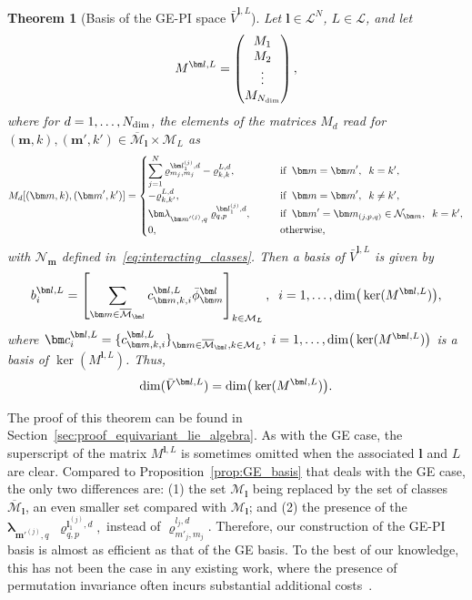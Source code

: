 \documentclass{article}
\newcommand{\vrho}[2]{\varrho^{#1}_{#2}}
\newcommand{\blamb}[2]{\bm\lambda^{#1}_{#2}}
\newcommand{\bphi}[2]{\bar\phi^{#1}_{#2}}
\newcommand{\bV}{{\bar V}}
\newcommand{\dd}{{d}}
\newcommand{\dimpi}[2]{\dim(\bV^{#1,#2})}
\newtheorem{theorem}{Theorem}[section]
\numberwithin{equation}{section}
\def\bc{{\bm c}}
\def\bl{{\bm l}}
\def\bbm{{\bm m}}
\def\calN{\mathcal{N}}
\def\calM{\mathcal{M}}
\def\calL{\mathcal{L}}
\def\oMl{\overline{\calM}_\bl}
\def\Nat{{N}}
\def\dim{{{\rm dim}}}
\begin{document}
{\begin{theorem}[Basis of the GE-PI space $\bV^{\bl,L}$]
\label{thm:GEPI_basis}
Let $\bl\in\calL^\Nat$, $L\in\calL$, and let 
\begin{equation}\label{eq:matM-PI}
         M^{\bl,L} = \begin{pmatrix}
         M_1 \\
         M_2 \\
         \vdots \\
         M_{N_{\rm{dim}}}
    \end{pmatrix},
    \end{equation}
    where for $\dd = 1,\ldots, N_{\rm{dim}}$,
    the elements of the matrices $M_\dd$ read for $(\bbm,k), (\bbm',k') \in \oMl\times \calM_L$ as
    \begin{equation}
    M_\dd[(\bbm,k),(\bbm',k')] = 
        \begin{cases}
        \displaystyle\sum_{j=1}^\Nat
        \vrho{\bl^{(j)}_1,\dd}{m_j,m_j} - \vrho{L,\dd}{k,k}, \qquad &\textup{if}\;\; \bbm=\bbm',  \; \; k=k', \\
         -\vrho{L,\dd}{k,k'}, \qquad &\textup{if}\;\; 
         \bbm = \bbm',  \; \;  k\ne k', \\
         \blamb{}{{\bbm'}^{(j)},q}
         \;\vrho{\bl^{(j)}_1,\dd}{q,p},  \qquad &\textup{if}\;\; 
         \bbm'=\bbm_{(j,p,q)}\in\calN_{\bbm}, \;\;  k = k',\\
        0, \qquad &\textup{otherwise,} \\
    \end{cases}
    \label{eq:M_GE_PI}
    \end{equation}
    with $\calN_\bbm$ defined in~\eqref{eq:interacting_classes}.
    Then a basis of $\bV^{\bl,L}$
    is given by 
    \[
    b^{\bl,L}_i = 
    \left[ 
    \sum_{\bbm \in \oMl}c_{\bbm,k,i}^{\bl,L}\bphi{\bl}{\bbm} \right]_{k\in \calM_L},\;\; i=1,\ldots,\dim\big(\ker(M^{\bl,L})\big),
    \]
     where 
     $\bc^{\bl,L}_i = \{c_{\bbm,k,i}^{\bl,L}\}_{\bbm\in\oMl,k\in\calM_L},\; i=1,\ldots,\dim\big(\ker(M^{\bl,L})\big)$
     is a basis of $\ker(M^{\bl,L})$. 
    Thus, 
    \[
        \dimpi{\bl}{L}=\dim\big(\ker(M^{\bl,L})\big).
    \]
\end{theorem}

The proof of this theorem can be found in Section~\ref{sec:proof_equivariant_lie_algebra}. 
As with the GE case, the superscript of the matrix $M^{\bl,L}$ is sometimes omitted when the associated $\bl$ and $L$ are clear. Compared to Proposition~\ref{prop:GE_basis} that deals with the GE case, the only two differences are: (1) the set $\calM_\bl$ being replaced by the set of classes $\oMl$, an even smaller set compared with $\calM_\bl$; and (2) the presence of the
 $
    \blamb{}{{\bbm'}^{(j)},q} \;\;
         \vrho{\bl^{(j)}_1,\dd}{q,p},  $
         instead of $\vrho{l_j,\dd}{m'_j,m_j}$.
Therefore, our construction of the GE-PI basis is almost as efficient as that of the GE basis. To the best of our knowledge, this has not been the case in any existing work, where the presence of permutation invariance often incurs substantial additional costs~\cite{Batatia2023-us,Dusson2022-ie,geiger2022e3nn}. 


}
\end{document}
